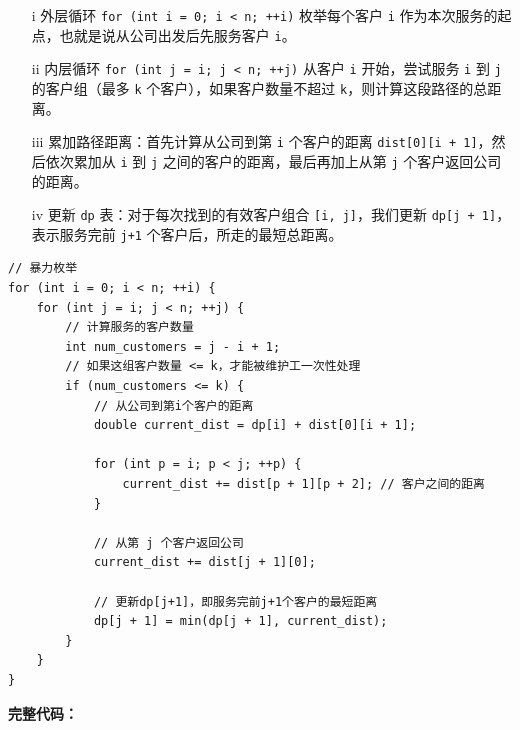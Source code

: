 \documentclass[a4paper]{ctexart}
\begin{document}
	\begin{itemize}
		\item[i] 外层循环 \texttt{for (int i = 0; i < n; ++i)} 枚举每个客户 \texttt{i} 作为本次服务的起点，也就是说从公司出发后先服务客户 \texttt{i}。
		
		\item[ii] 内层循环 \texttt{for (int j = i; j < n; ++j)} 从客户 \texttt{i} 开始，尝试服务 \texttt{i} 到 \texttt{j} 的客户组（最多 \texttt{k} 个客户），如果客户数量不超过 \texttt{k}，则计算这段路径的总距离。
		
		\item[iii] 累加路径距离：首先计算从公司到第 \texttt{i} 个客户的距离 \texttt{dist[0][i + 1]}，然后依次累加从 \texttt{i} 到 \texttt{j} 之间的客户的距离，最后再加上从第 \texttt{j} 个客户返回公司的距离。
		
		\item[iv] 更新 \texttt{dp} 表：对于每次找到的有效客户组合 \texttt{[i, j]}，我们更新 \texttt{dp[j + 1]}，表示服务完前 \texttt{j+1} 个客户后，所走的最短总距离。
	\end{itemize}

\begin{lstlisting}
// 暴力枚举
for (int i = 0; i < n; ++i) { 
	for (int j = i; j < n; ++j) {   
		// 计算服务的客户数量
		int num_customers = j - i + 1; 
		// 如果这组客户数量 <= k，才能被维护工一次性处理
		if (num_customers <= k) {
			// 从公司到第i个客户的距离
			double current_dist = dp[i] + dist[0][i + 1];
			
			for (int p = i; p < j; ++p) { 
				current_dist += dist[p + 1][p + 2]; // 客户之间的距离
			}
			
			// 从第 j 个客户返回公司
			current_dist += dist[j + 1][0];
			
			// 更新dp[j+1]，即服务完前j+1个客户的最短距离
			dp[j + 1] = min(dp[j + 1], current_dist); 
		}
	}
}
\end{lstlisting}

\noindent\textbf{完整代码：}
	
\end{document}
